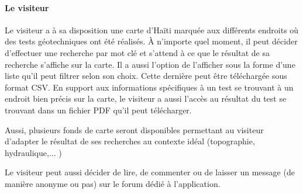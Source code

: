         \paragraph{Le visiteur}
        Le visiteur a à sa disposition une carte d'Haïti marquée aux différents endroits où des tests 
        géotechniques ont été réalisés.
        À n'importe quel moment, il peut décider d'effectuer une recherche par mot clé et s'attend
        à ce que le résultat de sa recherche s'affiche sur la carte. Il a aussi l'option de l'afficher sous la forme
        d'une liste qu'il peut filtrer selon son choix. Cette dernière peut être téléchargée sous format CSV.
        En support aux informations spécifiques à un test se trouvant à un endroit bien précis sur la carte,
        le visiteur a aussi l'accès au résultat du test se trouvant dans un fichier PDF qu'il peut télécharger.
        \par
        Aussi, plusieurs fonds de carte seront disponibles permettant au visiteur d'adapter le résultat de ses recherches
        au contexte idéal (topographie, hydraulique,... )
        \par
        Le visiteur peut aussi décider de lire, de commenter ou de laisser un message (de manière anonyme ou pas) 
        sur le forum dédié à l'application.
